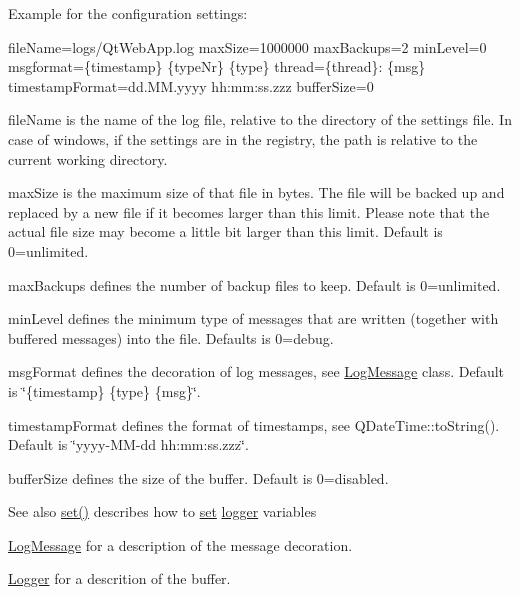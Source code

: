 Example for the configuration settings\+: {\ttfamily 
\begin{DoxyPre}
fileName=logs/QtWebApp.log
maxSize=1000000
maxBackups=2
minLevel=0
msgformat=\{timestamp\} \{typeNr\} \{type\} thread=\{thread\}: \{msg\}
timestampFormat=dd.MM.yyyy hh:mm:ss.zzz
bufferSize=0
\end{DoxyPre}
}


\begin{DoxyItemize}
\item file\+Name is the name of the log file, relative to the directory of the settings file. In case of windows, if the settings are in the registry, the path is relative to the current working directory.
\item max\+Size is the maximum size of that file in bytes. The file will be backed up and replaced by a new file if it becomes larger than this limit. Please note that the actual file size may become a little bit larger than this limit. Default is 0=unlimited.
\item max\+Backups defines the number of backup files to keep. Default is 0=unlimited.
\item min\+Level defines the minimum type of messages that are written (together with buffered messages) into the file. Defaults is 0=debug.
\item msg\+Format defines the decoration of log messages, see \mbox{\hyperlink{classstefanfrings_1_1_log_message}{Log\+Message}} class. Default is \char`\"{}\{timestamp\} \{type\} \{msg\}\char`\"{}.
\item timestamp\+Format defines the format of timestamps, see Q\+Date\+Time\+::to\+String(). Default is \char`\"{}yyyy-\/\+M\+M-\/dd hh\+:mm\+:ss.\+zzz\char`\"{}.
\item buffer\+Size defines the size of the buffer. Default is 0=disabled.
\end{DoxyItemize}

\begin{DoxySeeAlso}{See also}
\mbox{\hyperlink{classstefanfrings_1_1_logger_aeec74ca028bceb107a2337c5f6090432}{set()}} describes how to \mbox{\hyperlink{classstefanfrings_1_1_logger_aeec74ca028bceb107a2337c5f6090432}{set}} \mbox{\hyperlink{_logger_8cxx_abdf011b5bac957ec8be241da6fd8581b}{logger}} variables 

\mbox{\hyperlink{classstefanfrings_1_1_log_message}{Log\+Message}} for a description of the message decoration. 

\mbox{\hyperlink{classstefanfrings_1_1_logger}{Logger}} for a descrition of the buffer. 
\end{DoxySeeAlso}



